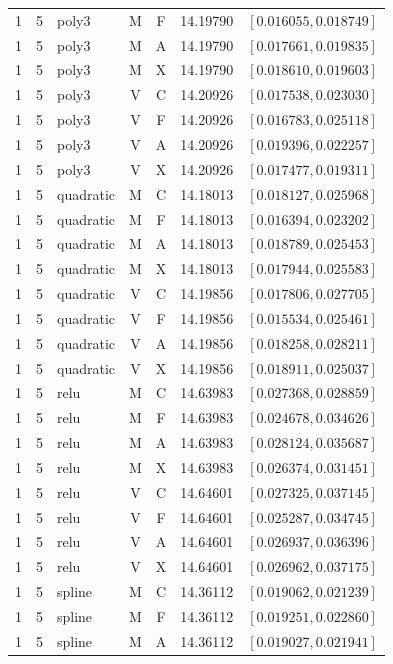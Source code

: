\begin{longtable}{r r l c c r l}
1 & 5 & poly3 & M & F & 14.19790 & $[0.016055,0.018749]$ \\
1 & 5 & poly3 & M & A & 14.19790 & $[0.017661,0.019835]$ \\
1 & 5 & poly3 & M & X & 14.19790 & $[0.018610,0.019603]$ \\
1 & 5 & poly3 & V & C & 14.20926 & $[0.017538,0.023030]$ \\
1 & 5 & poly3 & V & F & 14.20926 & $[0.016783,0.025118]$ \\
1 & 5 & poly3 & V & A & 14.20926 & $[0.019396,0.022257]$ \\
1 & 5 & poly3 & V & X & 14.20926 & $[0.017477,0.019311]$ \\
1 & 5 & quadratic & M & C & 14.18013 & $[0.018127,0.025968]$ \\
1 & 5 & quadratic & M & F & 14.18013 & $[0.016394,0.023202]$ \\
1 & 5 & quadratic & M & A & 14.18013 & $[0.018789,0.025453]$ \\
1 & 5 & quadratic & M & X & 14.18013 & $[0.017944,0.025583]$ \\
1 & 5 & quadratic & V & C & 14.19856 & $[0.017806,0.027705]$ \\
1 & 5 & quadratic & V & F & 14.19856 & $[0.015534,0.025461]$ \\
1 & 5 & quadratic & V & A & 14.19856 & $[0.018258,0.028211]$ \\
1 & 5 & quadratic & V & X & 14.19856 & $[0.018911,0.025037]$ \\
1 & 5 & relu & M & C & 14.63983 & $[0.027368,0.028859]$ \\
1 & 5 & relu & M & F & 14.63983 & $[0.024678,0.034626]$ \\
1 & 5 & relu & M & A & 14.63983 & $[0.028124,0.035687]$ \\
1 & 5 & relu & M & X & 14.63983 & $[0.026374,0.031451]$ \\
1 & 5 & relu & V & C & 14.64601 & $[0.027325,0.037145]$ \\
1 & 5 & relu & V & F & 14.64601 & $[0.025287,0.034745]$ \\
1 & 5 & relu & V & A & 14.64601 & $[0.026937,0.036396]$ \\
1 & 5 & relu & V & X & 14.64601 & $[0.026962,0.037175]$ \\
1 & 5 & spline & M & C & 14.36112 & $[0.019062,0.021239]$ \\
1 & 5 & spline & M & F & 14.36112 & $[0.019251,0.022860]$ \\
1 & 5 & spline & M & A & 14.36112 & $[0.019027,0.021941]$ \\

\end{longtable}
